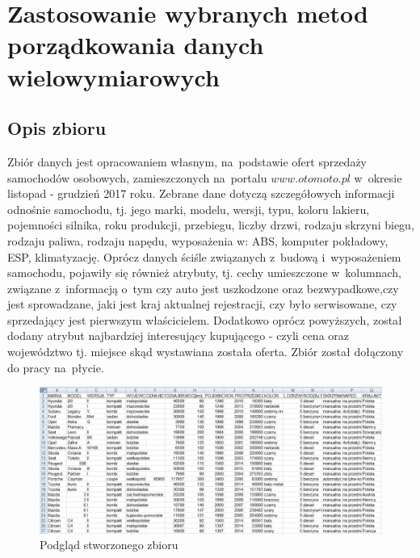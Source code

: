 \documentclass[12pt,a4paper]{report}
\begin{document}
\chapter{Zastosowanie wybranych metod porządkowania danych wielowymiarowych}\label{Zastosowanie}



\section{Opis zbioru}

Zbiór danych jest opracowaniem własnym, na~podstawie ofert sprzedaży samochodów osobowych, zamieszczonych na~portalu $www.otomoto.pl$ w~okresie listopad - grudzień 2017 roku. Zebrane dane dotyczą szczegółowych informacji odnośnie samochodu, tj. jego marki, modelu, wersji, typu, koloru lakieru, pojemności silnika, roku produkcji, przebiegu, liczby drzwi, rodzaju skrzyni biegu, rodzaju paliwa, rodzaju napędu, wyposażenia w: ABS, komputer pokładowy, ESP, klimatyzację. Oprócz danych ściśle związanych z~budową i~wyposażeniem samochodu, pojawiły się również atrybuty, tj. cechy umieszczone w~kolumnach, związane z~informacją o~tym czy auto jest uszkodzone oraz bezwypadkowe,czy jest sprowadzane, jaki jest kraj aktualnej rejestracji, czy było serwisowane, czy sprzedający jest pierwszym właścicielem. Dodatkowo oprócz powyższych, został dodany atrybut najbardziej interesujący kupującego - czyli cena oraz województwo tj. miejsce skąd wystawiana została oferta. Zbiór został dołączony do pracy na~płycie. 
\begin{figure}[h]
\centering
\includegraphics[width=1\textwidth]{img/zbior3.jpg}
\caption{Podgląd stworzonego zbioru}
\end{figure}
\end{document}
